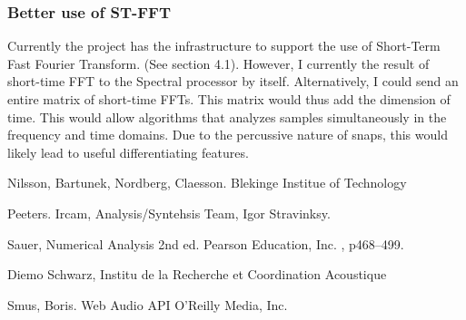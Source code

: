 \documentclass[DIV=calc, paper=a4, fontsize=11pt, twocolumn]{scrartcl}   %
\begin{document}
   \subsubsection{Better use of ST-FFT}
   Currently the project has the infrastructure to support the use of Short-Term Fast Fourier Transform. (See section 4.1). However, I currently the result  of short-time FFT to the Spectral processor by itself. Alternatively, I could send an entire matrix of short-time FFTs. This matrix would thus add the dimension of time. This would allow algorithms that analyzes samples simultaneously in the frequency and time domains. Due to the percussive nature of snaps, this would likely lead to useful differentiating features.


\begin{thebibliography}{99} %


Nilsson, Bartunek, Nordberg, Claesson. Blekinge Institue of Technology

Peeters. Ircam, Analysis/Syntehsis Team, Igor Stravinksy.

Sauer, Numerical Analysis 2nd ed. Pearson Education, Inc.
, p468--499.

Diemo Schwarz, Institu de la Recherche et Coordination Acoustique

Smus, Boris. Web Audio API O'Reilly Media, Inc.


\end{thebibliography}

\end{document}
